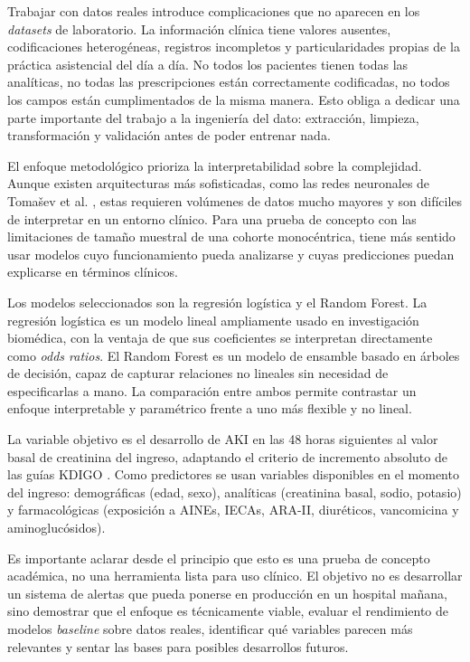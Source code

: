 \documentclass[12pt, a4paper, oneside]{report}
\begin{document}
Trabajar con datos reales introduce complicaciones que no aparecen en los \textit{datasets} de laboratorio. La información clínica tiene valores ausentes, codificaciones heterogéneas, registros incompletos y particularidades propias de la práctica asistencial del día a día. No todos los pacientes tienen todas las analíticas, no todas las prescripciones están correctamente codificadas, no todos los campos están cumplimentados de la misma manera. Esto obliga a dedicar una parte importante del trabajo a la ingeniería del dato: extracción, limpieza, transformación y validación antes de poder entrenar nada.

El enfoque metodológico prioriza la interpretabilidad sobre la complejidad. Aunque existen arquitecturas más sofisticadas, como las redes neuronales de Tomašev et al. \parencite{tomasev2019nature}, estas requieren volúmenes de datos mucho mayores y son difíciles de interpretar en un entorno clínico. Para una prueba de concepto con las limitaciones de tamaño muestral de una cohorte monocéntrica, tiene más sentido usar modelos cuyo funcionamiento pueda analizarse y cuyas predicciones puedan explicarse en términos clínicos.

Los modelos seleccionados son la regresión logística y el Random Forest. La regresión logística es un modelo lineal ampliamente usado en investigación biomédica, con la ventaja de que sus coeficientes se interpretan directamente como \textit{odds ratios}. El Random Forest es un modelo de ensamble basado en árboles de decisión, capaz de capturar relaciones no lineales sin necesidad de especificarlas a mano. La comparación entre ambos permite contrastar un enfoque interpretable y paramétrico frente a uno más flexible y no lineal.

La variable objetivo es el desarrollo de AKI en las 48 horas siguientes al valor basal de creatinina del ingreso, adaptando el criterio de incremento absoluto de las guías KDIGO \parencite{kdigo2012aki}. Como predictores se usan variables disponibles en el momento del ingreso: demográficas (edad, sexo), analíticas (creatinina basal, sodio, potasio) y farmacológicas (exposición a AINEs, IECAs, ARA-II, diuréticos, vancomicina y aminoglucósidos).

Es importante aclarar desde el principio que esto es una prueba de concepto académica, no una herramienta lista para uso clínico. El objetivo no es desarrollar un sistema de alertas que pueda ponerse en producción en un hospital mañana, sino demostrar que el enfoque es técnicamente viable, evaluar el rendimiento de modelos \textit{baseline} sobre datos reales, identificar qué variables parecen más relevantes y sentar las bases para posibles desarrollos futuros.
\end{document}
